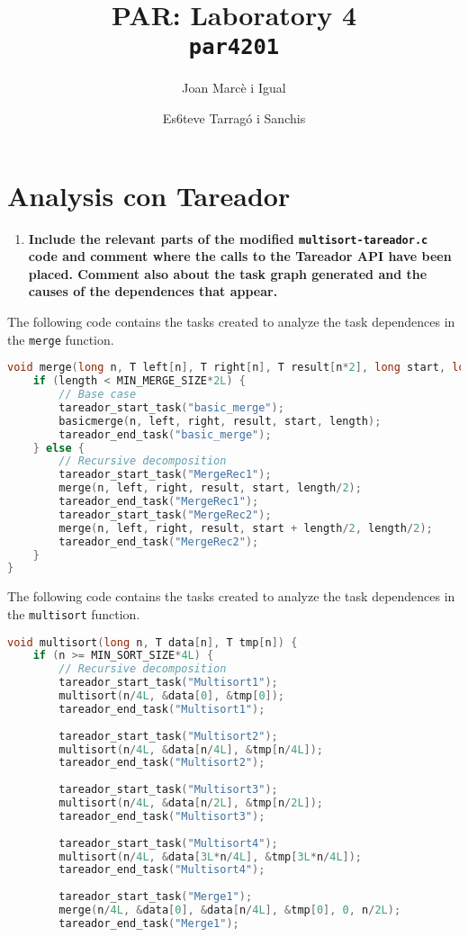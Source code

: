 \documentclass[a4paper]{article}
\title{PAR: Laboratory 4 \\
		\texttt{\large par4201}}
\author{Joan Marcè i Igual \and Es6teve Tarragó i Sanchis}
\newenvironment{questionenum}{%
\setlist[enumerate]{resume}
\restartlist{enumerate}
\newcommand{\question}[1]{
\begin{enumerate}
	\item\bfseries ##1
\end{enumerate}
}}{%
}
\begin{document}
\maketitle
\tableofcontents

\section{Analysis con Tareador}
\begin{questionenum}
	\question{Include the relevant parts of the modified \texttt{multisort-tareador.c} code and comment where the calls to the Tareador API have been placed. Comment also about the task graph generated and the causes of the dependences that appear.}
	
	The following code contains the tasks created to analyze the task dependences in the \verb|merge| function.
\begin{lstlisting}[language=C]
void merge(long n, T left[n], T right[n], T result[n*2], long start, long length) {
	if (length < MIN_MERGE_SIZE*2L) {
		// Base case
		tareador_start_task("basic_merge");
		basicmerge(n, left, right, result, start, length);
		tareador_end_task("basic_merge");
	} else {
		// Recursive decomposition
		tareador_start_task("MergeRec1");
		merge(n, left, right, result, start, length/2);
		tareador_end_task("MergeRec1");
		tareador_start_task("MergeRec2");
		merge(n, left, right, result, start + length/2, length/2);
		tareador_end_task("MergeRec2");
	}
}
\end{lstlisting}

	The following code contains the tasks created to analyze the task dependences in the \verb|multisort| function.
	
\begin{lstlisting}[language=C]
void multisort(long n, T data[n], T tmp[n]) {
	if (n >= MIN_SORT_SIZE*4L) {
		// Recursive decomposition
		tareador_start_task("Multisort1");
		multisort(n/4L, &data[0], &tmp[0]);
		tareador_end_task("Multisort1");
		
		tareador_start_task("Multisort2");
		multisort(n/4L, &data[n/4L], &tmp[n/4L]);
		tareador_end_task("Multisort2");
		
		tareador_start_task("Multisort3");
		multisort(n/4L, &data[n/2L], &tmp[n/2L]);
		tareador_end_task("Multisort3");
		
		tareador_start_task("Multisort4");
		multisort(n/4L, &data[3L*n/4L], &tmp[3L*n/4L]);
		tareador_end_task("Multisort4");
		
		tareador_start_task("Merge1");
		merge(n/4L, &data[0], &data[n/4L], &tmp[0], 0, n/2L);
		tareador_end_task("Merge1");
		

\end{lstlisting}
\end{questionenum}
\end{document}
